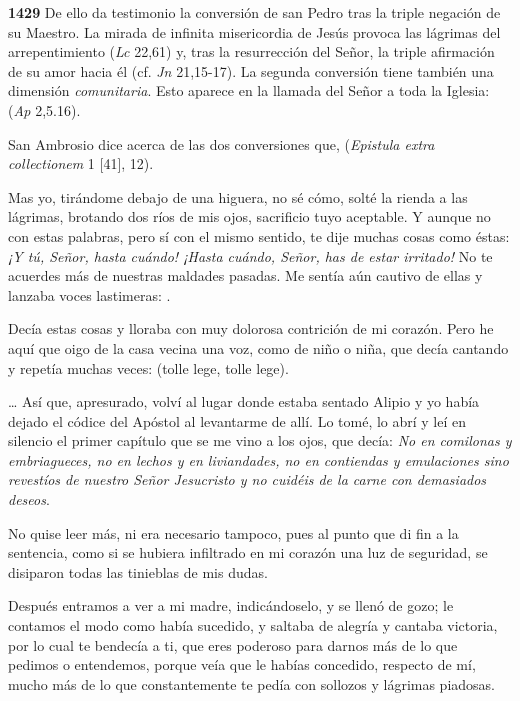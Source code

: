 \begin{body}
\begin{body}
\textbf{1429} De ello da testimonio la conversión de san Pedro tras la triple negación de su Maestro. La mirada de infinita misericordia de Jesús provoca las lágrimas del arrepentimiento (\emph{Lc} 22,61) y, tras la resurrección del Señor, la triple afirmación de su amor hacia él (cf. \emph{Jn} 21,15-17). La segunda conversión tiene también una dimensión \emph{comunitaria}. Esto aparece en la llamada del Señor a toda la Iglesia:  (\emph{Ap} 2,5.16).

San Ambrosio dice acerca de las dos conversiones que,  (\emph{Epistula extra collectionem} 1 {[}41{]}, 12).

Mas yo, tirándome debajo de una higuera, no sé cómo, solté la rienda a las lágrimas, brotando dos ríos de mis ojos, sacrificio tuyo aceptable. Y aunque no con estas palabras, pero sí con el mismo sentido, te dije muchas cosas como éstas: \emph{¡Y tú, Señor, hasta cuándo! ¡Hasta cuándo, Señor, has de estar irritado!} No te acuerdes más de nuestras maldades pasadas. Me sentía aún cautivo de ellas y lanzaba voces lastimeras: .

Decía estas cosas y lloraba con muy dolorosa contrición de mi corazón. Pero he aquí que oigo de la casa vecina una voz, como de niño o niña, que decía cantando y repetía muchas veces:  (tolle lege, tolle lege).

\ldots{} Así que, apresurado, volví al lugar donde estaba sentado Alipio y yo había dejado el códice del Apóstol al levantarme de allí. Lo tomé, lo abrí y leí en silencio el primer capítulo que se me vino a los ojos, que decía: \emph{No en comilonas y embriagueces, no en lechos y en liviandades, no en contiendas y emulaciones sino revestíos de nuestro Señor Jesucristo y no cuidéis de la carne con demasiados deseos}.

No quise leer más, ni era necesario tampoco, pues al punto que di fin a la sentencia, como si se hubiera infiltrado en mi corazón una luz de seguridad, se disiparon todas las tinieblas de mis dudas.

Después entramos a ver a mi madre, indicándoselo, y se llenó de gozo; le contamos el modo como había sucedido, y saltaba de alegría y cantaba victoria, por lo cual te bendecía a ti, que eres poderoso para darnos más de lo que pedimos o entendemos, porque veía que le habías concedido, respecto de mí, mucho más de lo que constantemente te pedía con sollozos y lágrimas piadosas.


\end{body}
\end{body}
